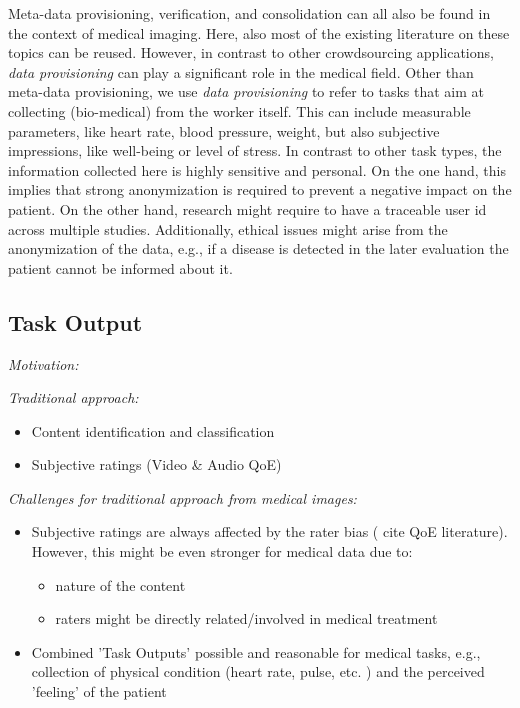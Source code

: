 \documentclass[10pt,twocolumn,letterpaper]{article}
\begin{document}
Meta-data provisioning, verification, and consolidation can all also be found in the context of medical imaging.
Here, also most of the existing literature on these topics can be reused.
However, in contrast to other crowdsourcing applications, \emph{data provisioning} can play a significant role in the medical field.
Other than meta-data provisioning, we use \emph{data provisioning} to refer to tasks that aim at collecting (bio-medical) from the worker itself.
This can include measurable parameters, like heart rate, blood pressure, weight, but also subjective impressions, like well-being or level of stress.
In contrast to other task types, the information collected here is highly sensitive and personal.
On the one hand, this implies that strong anonymization is required to prevent a negative impact on the patient.
On the other hand, research might require to have a traceable user id across multiple studies.
Additionally, ethical issues might arise from the anonymization of the data, e.g., if a disease is detected in the later evaluation the patient cannot be informed about it.





\subsection{Task Output}
\emph{Motivation:} 

\emph{Traditional approach:}
\begin{itemize}
    \item Content identification and classification
    \item Subjective ratings (Video \& Audio QoE)
\end{itemize}

\emph{Challenges for traditional approach from medical images:}
\begin{itemize}
    \item Subjective ratings are always affected by the rater bias ( cite QoE literature). However, this might be even stronger for medical data due to: 
        \begin{itemize}
            \item nature of the content
            \item raters might be directly related/involved in medical treatment
        \end{itemize}
    \item Combined 'Task Outputs' possible and reasonable for medical tasks, e.g., collection of physical condition (heart rate, pulse, etc. ) and the perceived 'feeling' of the patient
\end{itemize}
\end{document}

